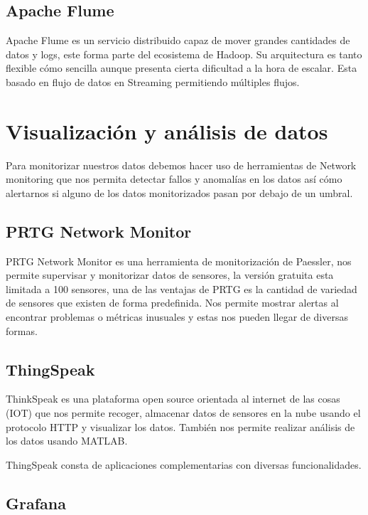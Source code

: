 \subsection{Apache Flume}

Apache Flume es un servicio distribuido capaz de mover grandes cantidades de datos y logs, este forma parte del ecosistema de Hadoop. Su arquitectura es tanto flexible cómo sencilla aunque presenta cierta dificultad a la hora de escalar. Esta basado en flujo de datos en Streaming permitiendo múltiples flujos.\cite{pagina:Flume}

\section{Visualización y análisis de datos}

Para monitorizar nuestros datos debemos hacer uso de herramientas de Network monitoring que nos permita detectar fallos y anomalías en los datos así cómo alertarnos si alguno de los datos monitorizados pasan por debajo de un umbral.

\subsection{PRTG Network Monitor}

PRTG Network Monitor es una herramienta de monitorización de Paessler, nos permite supervisar y monitorizar datos de sensores,  la versión gratuita esta limitada a 100 sensores, una de las ventajas de PRTG es la cantidad de variedad de sensores que existen de forma predefinida. Nos permite mostrar alertas al encontrar problemas o métricas inusuales y estas nos pueden llegar de diversas formas.\cite{pagina:PRTG}

\subsection{ThingSpeak}

ThinkSpeak es una plataforma open source orientada al internet de las cosas (IOT) que nos permite recoger, almacenar datos de sensores en la nube usando el protocolo HTTP y visualizar los datos. También nos permite realizar análisis de los datos usando MATLAB. 

ThingSpeak consta de aplicaciones complementarias con diversas funcionalidades. \cite{pagina:ThingSpeak}

\subsection{Grafana}


